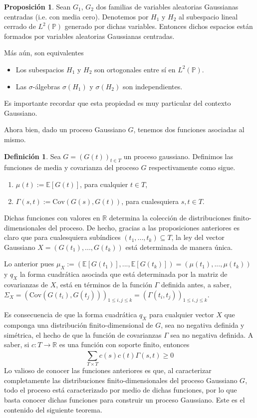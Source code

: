 \documentclass[letterpaper,twoside,12pt]{book}
\newcommand{\R}{\mathbb{R}}
\newcommand{\E}{\mathbb{E}}
\renewcommand{\P}{\mathbb{P}}
\newcommand{\1}{\mathds{1}}
\renewcommand{\to}{\rightarrow}
\theoremstyle{definition}
\newtheorem{dfn}{Definición}
\theoremstyle{definition}
\theoremstyle{definition}
\theoremstyle{definition}
\newtheorem{prop}{Proposición}
\theoremstyle{definition}
\theoremstyle{definition}
\theoremstyle{definition}
\begin{document}
\begin{prop}\label{Gaussi_indep} 
 Sean $G_1$, $G_2$ dos familias de variables aleatorias Gaussianas centradas (i.e. con media cero). Denotemos por $H_1$ y $H_2$ al subespacio lineal cerrado de $L^{2}(\P)$ generado por dichas variables. Entonces dichos espacios están formados por variables aleatorias Gaussianas centradas.

 Más aún, son equivalentes 
 \begin{itemize}
    \item Los subespacios $H_1$ y $H_2$ son ortogonales entre sí en $L^{2}(\P)$.
    \item Las $\sigma$-álgebras $\sigma(H_1)$ y $\sigma(H_2)$ son independientes.
 \end{itemize}
 Es importante recordar que esta propiedad es muy particular del contexto Gaussiano.
 \end{prop}
Ahora bien, dado un proceso Gaussiano $G$, tenemos dos funciones asociadas al mismo.
\begin{dfn} 
 Sea $G=(G(t))_{t\in T}$ un proceso gaussiano. Definimos las funciones de media y covarianza del proceso $G$ respectivamente como sigue.
 \begin{enumerate}
    \item $\mu(t):=\E\left[G(t)\right]$, \qquad para cualquier $t\in T$,
    \item $\Gamma(s,t):= \text{Cov}\left(G(s),G(t)\right)$, \qquad para cualesquiera $s,t\in T$.
 \end{enumerate}
 \end{dfn}
Dichas funciones con valores en $\R$ determina la colección de distribuciones finito-dimensionales del proceso. 
De hecho, gracias a las proposiciones anteriores es claro que para cualesquiera subíndices $(t_1,...,t_k)\subseteq T$, la ley del vector Gaussiano $X=(G(t_1),...,G(t_k))$ está determinada de manera única. 

Lo anterior pues $\mu_X:=(\E\left[G(t_1)\right],...,\E\left[G(t_k)\right])=(\mu(t_1),...,\mu(t_k))$ y $q_X$ la forma cuadrática asociada que está determinada por la matriz de covarianzas de $X$, está en términos de la función $\Gamma$ definida antes, a saber, $\Sigma_X=\left(\text{Cov}\left(G(t_i),G(t_j)\right)\right)_{1\leq i,j\le k}=\left(\Gamma(t_i,t_j)\right)_{1\le i,j\le k }$.

Es consecuencia de que la forma cuadrática $q_X$ para cualquier vector $X$ que componga una distribución finito-dimensional de $G$, sea no negativa definida y simétrica, el hecho de que la función de covarianzas $\Gamma$ sea no negativa definida. A saber, si $c:T\to \R$ es una función con soporte finito, entonces 
\[  
    \sum_{T\times T}^{}c(s)c(t)\Gamma(s,t)\geq0
\]
Lo valioso de conocer las funciones anteriores es que, al caracterizar completamente las distribuciones finito-dimensionales del proceso Gaussiano $G$, todo el proceso está caracterizado por medio de dichas funciones, por lo que basta conocer dichas funciones para construir un proceso Gaussiano. Este es el contenido del siguiente teorema.
\end{document}

